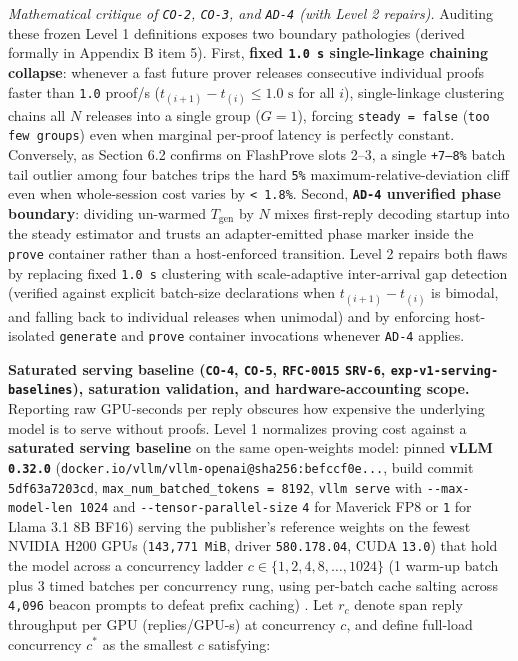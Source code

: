 \documentclass[11pt,letterpaper]{article}
\begin{document}
\textit{Mathematical critique of \texttt{CO-2}, \texttt{CO-3}, and \texttt{AD-4} (with Level 2 repairs).} Auditing these frozen Level 1 definitions exposes two boundary pathologies (derived formally in Appendix B item 5). First, \textbf{fixed \texttt{1.0 s} single-linkage chaining collapse}: whenever a fast future prover releases consecutive individual proofs faster than \texttt{1.0} proof/s ($t_{(i+1)} - t_{(i)} \le 1.0\text{ s}$ for all $i$), single-linkage clustering chains all $N$ releases into a single group ($G = 1$), forcing \texttt{steady = false} (\texttt{too few groups}) even when marginal per-proof latency is perfectly constant. Conversely, as Section 6.2 confirms on FlashProve slots 2--3, a single \texttt{+7--8\%} batch tail outlier among four batches trips the hard \texttt{5\%} maximum-relative-deviation cliff even when whole-session cost varies by \texttt{< 1.8\%}. Second, \textbf{\texttt{AD-4} unverified phase boundary}: dividing un-warmed $T_{\text{gen}}$ by $N$ mixes first-reply decoding startup into the steady estimator and trusts an adapter-emitted phase marker inside the \texttt{prove} container rather than a host-enforced transition. Level 2 repairs both flaws by replacing fixed \texttt{1.0 s} clustering with scale-adaptive inter-arrival gap detection (verified against explicit batch-size declarations when $t_{(i+1)} - t_{(i)}$ is bimodal, and falling back to individual releases when unimodal) and by enforcing host-isolated \texttt{generate} and \texttt{prove} container invocations whenever \texttt{AD-4} applies.

\textbf{Saturated serving baseline (\texttt{CO-4}, \texttt{CO-5}, \texttt{RFC-0015} \texttt{SRV-6}, \texttt{exp-\allowbreak{}v1-\allowbreak{}serving-\allowbreak{}baselines}), saturation validation, and hardware-accounting scope.} Reporting raw GPU-seconds per reply obscures how expensive the underlying model is to serve without proofs. Level 1 normalizes proving cost against a \textbf{saturated serving baseline} on the same open-weights model: pinned \textbf{vLLM \texttt{0.32.0}} (\texttt{docker.\allowbreak{}io/\allowbreak{}vllm/\allowbreak{}vllm-\allowbreak{}openai@\allowbreak{}sha256:\allowbreak{}befccf0e...}, build commit \texttt{5df63a7203cd}, \texttt{max\_\allowbreak{}num\_\allowbreak{}batched\_\allowbreak{}tokens = 8192}, \texttt{vllm serve} with \texttt{-{}-max-\allowbreak{}model-\allowbreak{}len 1024} and \texttt{-{}-tensor-\allowbreak{}parallel-\allowbreak{}size} \texttt{4} for Maverick FP8 or \texttt{1} for Llama 3.1 8B BF16) serving the publisher's reference weights on the fewest NVIDIA H200 GPUs (\texttt{143,771 MiB}, driver \texttt{580.178.04}, CUDA \texttt{13.0}) that hold the model across a concurrency ladder $c \in \{1, 2, 4, 8, \dots, 1024\}$ (1 warm-up batch plus 3 timed batches per concurrency rung, using per-batch cache salting across \texttt{4,096} beacon prompts to defeat prefix caching) \cite{iproofs2026}. Let $r_c$ denote span reply throughput per GPU (replies/GPU-s) at concurrency $c$, and define full-load concurrency $c^*$ as the smallest $c$ satisfying:
\end{document}
